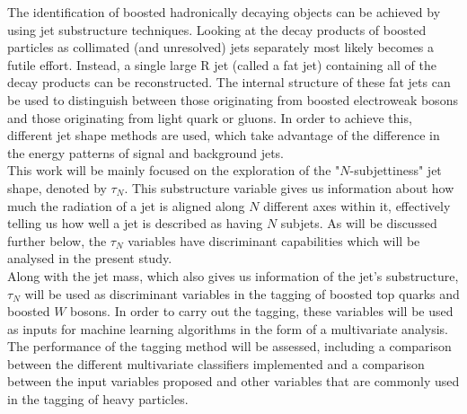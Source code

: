 \documentclass[main]{subfiles} %
\begin{document}
The identification of boosted hadronically decaying objects can be achieved by using jet substructure techniques. Looking at the decay products of boosted particles as collimated (and unresolved) jets separately most likely becomes a futile effort. Instead, a single large R jet (called a fat jet) containing all of the decay products can be reconstructed. The internal structure of these fat jets can be used to distinguish between those originating from boosted electroweak bosons and those originating from light quark or gluons. In order to achieve this, different jet shape methods are used, which take advantage of the difference in the energy patterns of signal and background jets. \\

This work will be mainly focused on the exploration of the "$N$-subjettiness" jet shape, denoted by $\tau_N$. This substructure variable gives us information about how much the radiation of a jet is aligned along $N$ different axes within it, effectively telling us how well a jet is described as having $N$ subjets. As will be discussed further below, the $\tau_N$ variables have discriminant capabilities which will be analysed in the present study. \\

Along with the jet mass, which also gives us information of the jet's substructure, $\tau_N$ will be used as discriminant variables in the tagging of boosted top quarks and boosted $W$ bosons. In order to carry out the tagging, these variables will be used as inputs for machine learning algorithms in the form of a multivariate analysis. The performance of the tagging method will be assessed, including a comparison between the different multivariate classifiers implemented and a comparison between the input variables proposed and other variables that are commonly used in the tagging of heavy particles. \\




















\biblio
\end{document}
